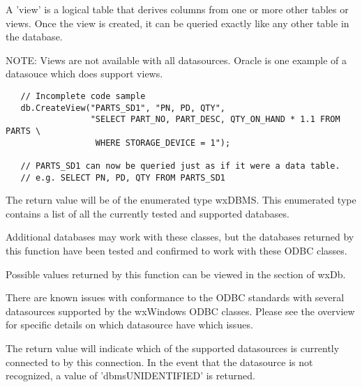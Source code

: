 
A 'view' is a logical table that derives columns from one or more other tables or views.  Once the view is created, it can be queried exactly like any other table in the database.

NOTE: Views are not available with all datasources.  Oracle is one example of a datasouce which does support views.


\begin{verbatim}
   // Incomplete code sample
   db.CreateView("PARTS_SD1", "PN, PD, QTY",  
                 "SELECT PART_NO, PART_DESC, QTY_ON_HAND * 1.1 FROM PARTS \
                  WHERE STORAGE_DEVICE = 1");

   // PARTS_SD1 can now be queried just as if it were a data table.
   // e.g. SELECT PN, PD, QTY FROM PARTS_SD1
\end{verbatim}


\label{wxdbdbms}



The return value will be of the enumerated type wxDBMS.  This enumerated
type contains a list of all the currently tested and supported databases.

Additional databases may work with these classes, but the databases
returned by this function have been tested and confirmed to work with 
these ODBC classes.

Possible values returned by this function can be viewed in the 
 section of wxDb.

There are known issues with conformance to the ODBC standards with several
datasources supported by the wxWindows ODBC classes.  Please see the overview 
for specific details on which datasource have which issues.


The return value will indicate which of the supported datasources is 
currently connected to by this connection.  In the event that the
datasource is not recognized, a value of 'dbmsUNIDENTIFIED' is returned.


\label{wxdbdispallerrors}


